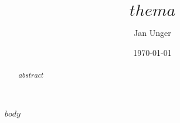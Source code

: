 \documentclass{vorlage-design-main}
\title{$thema$}
\author{Jan Unger}
\date{\today}
\begin{document}
\maketitle

\begin{abstract}
$abstract$
\end{abstract}

$body$


\clearpage
\printbibliography
\end{document}
